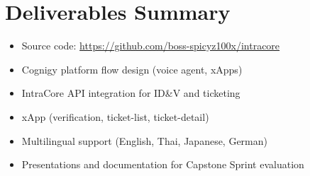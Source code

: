\documentclass{article}
\begin{document}
\section{Deliverables Summary}

\begin{itemize}[noitemsep]
  \item Source code: \url{https://github.com/boss-spicyz100x/intracore}
  \item Cognigy platform flow design (voice agent, xApps)
  \item IntraCore API integration for ID\&V and ticketing
  \item xApp (verification, ticket-list, ticket-detail)
  \item Multilingual support (English, Thai, Japanese, German)
  \item Presentations and documentation for Capstone Sprint evaluation
\end{itemize}
\end{document}
